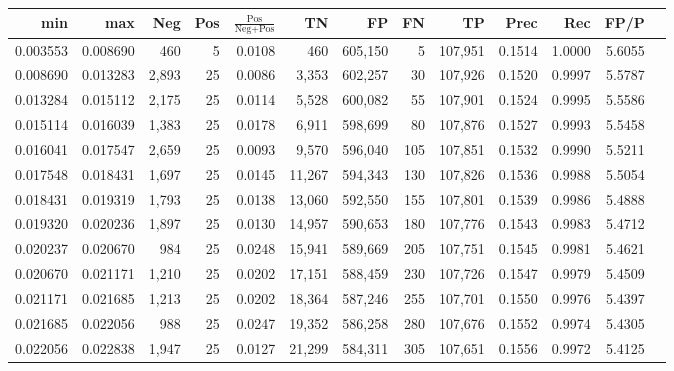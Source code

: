 \begin{tabular}{rrrrrrrrrrrrr}
\toprule
     min &      max &   Neg & Pos & $\frac{\text{Pos}}{\text{Neg}+\text{Pos}}$ &      TN &      FP &      FN &      TP &   Prec &    Rec &   FP/P \\
\midrule
0.003553 & 0.008690 &   460 &   5 &                                     0.0108 &     460 & 605,150 &       5 & 107,951 & 0.1514 & 1.0000 & 5.6055 \\
0.008690 & 0.013283 & 2,893 &  25 &                                     0.0086 &   3,353 & 602,257 &      30 & 107,926 & 0.1520 & 0.9997 & 5.5787 \\
0.013284 & 0.015112 & 2,175 &  25 &                                     0.0114 &   5,528 & 600,082 &      55 & 107,901 & 0.1524 & 0.9995 & 5.5586 \\
0.015114 & 0.016039 & 1,383 &  25 &                                     0.0178 &   6,911 & 598,699 &      80 & 107,876 & 0.1527 & 0.9993 & 5.5458 \\
0.016041 & 0.017547 & 2,659 &  25 &                                     0.0093 &   9,570 & 596,040 &     105 & 107,851 & 0.1532 & 0.9990 & 5.5211 \\
0.017548 & 0.018431 & 1,697 &  25 &                                     0.0145 &  11,267 & 594,343 &     130 & 107,826 & 0.1536 & 0.9988 & 5.5054 \\
0.018431 & 0.019319 & 1,793 &  25 &                                     0.0138 &  13,060 & 592,550 &     155 & 107,801 & 0.1539 & 0.9986 & 5.4888 \\
0.019320 & 0.020236 & 1,897 &  25 &                                     0.0130 &  14,957 & 590,653 &     180 & 107,776 & 0.1543 & 0.9983 & 5.4712 \\
0.020237 & 0.020670 &   984 &  25 &                                     0.0248 &  15,941 & 589,669 &     205 & 107,751 & 0.1545 & 0.9981 & 5.4621 \\
0.020670 & 0.021171 & 1,210 &  25 &                                     0.0202 &  17,151 & 588,459 &     230 & 107,726 & 0.1547 & 0.9979 & 5.4509 \\
0.021171 & 0.021685 & 1,213 &  25 &                                     0.0202 &  18,364 & 587,246 &     255 & 107,701 & 0.1550 & 0.9976 & 5.4397 \\
0.021685 & 0.022056 &   988 &  25 &                                     0.0247 &  19,352 & 586,258 &     280 & 107,676 & 0.1552 & 0.9974 & 5.4305 \\
0.022056 & 0.022838 & 1,947 &  25 &                                     0.0127 &  21,299 & 584,311 &     305 & 107,651 & 0.1556 & 0.9972 & 5.4125 \\

\end{tabular}
